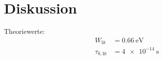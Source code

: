 \section{Diskussion}
\label{sec:Diskussion}

Theoriewerte\cite{RMucillo}: 
\begin{align*}
    W_\text{lit}&= \qty{0.66}{\electronvolt}\\
    \tau_{0,\text{lit}}&= \qty{4e-14}{\second} 
\end{align*}